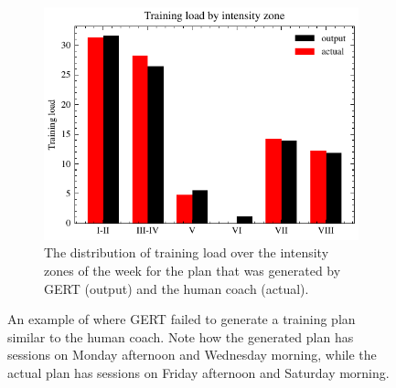 \begin{figure}[ht]
    \begin{subfigure}[t]{0.7\textwidth}
        \centering
        \includegraphics[width=\textwidth]{chapters/figures/result_examples/bad_zone.pdf}
        \captionsetup{width=.9\linewidth}
        \caption{The distribution of training load over the intensity zones of the week for the plan that was generated by GERT (output) and the human coach (actual).}
    \end{subfigure}
    \caption{An example of where GERT failed to generate a training plan similar to the human coach. Note how the generated plan has sessions on Monday afternoon and Wednesday morning, while the actual plan has sessions on Friday afternoon and Saturday morning.}
\end{figure}
